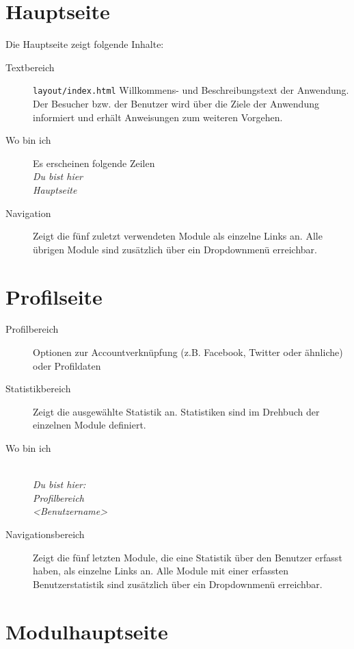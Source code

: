 %
%
%
\section{Hauptseite}
\label{sec:main-page}

Die Hauptseite zeigt folgende Inhalte:
\begin{description}
  \item[Textbereich] \texttt{layout/index.html} Willkommens- und Beschreibungstext der Anwendung. Der Besucher bzw. der Benutzer wird über die Ziele der Anwendung informiert und erhält Anweisungen zum weiteren Vorgehen.
  \item[Wo bin ich] Es erscheinen folgende Zeilen \emph{\\Du bist hier \\Hauptseite}
  \item[Navigation] Zeigt die fünf zuletzt verwendeten Module als einzelne Links an. Alle übrigen Module sind zusätzlich über ein Dropdownmenü erreichbar.
	
\end{description}




%
%
%
\section{Profilseite}
\label{sec:profile-page}

\begin{description}
  \item[Profilbereich] Optionen zur Accountverknüpfung (z.B. Facebook, Twitter oder ähnliche) oder Profildaten
  \item[Statistikbereich] Zeigt die ausgewählte Statistik an. Statistiken sind im Drehbuch der einzelnen Module definiert.
  \item[Wo bin ich] \emph{\\Du bist hier:\\Profilbereich\\<Benutzername>}
  \item[Navigationsbereich] Zeigt die fünf letzten Module, die eine Statistik über den Benutzer erfasst haben, als einzelne Links an. 
	Alle Module mit einer erfassten Benutzerstatistik sind zusätzlich über ein Dropdownmenü erreichbar.
\end{description}




%
%
%
\section{Modulhauptseite}
\label{sec:module-main-page}

